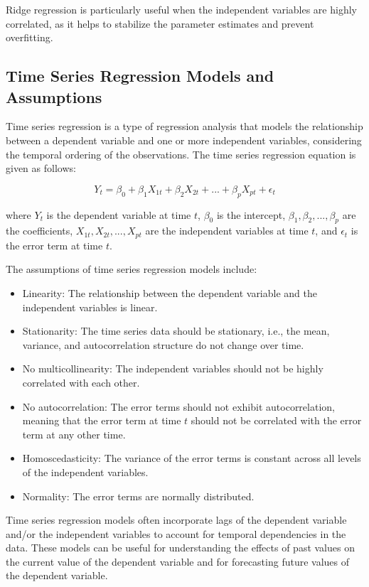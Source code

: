 \documentclass{article}
\begin{document}
Ridge regression is particularly useful when the independent variables are highly correlated, as it helps to stabilize the parameter estimates and prevent overfitting.

\subsection{Time Series Regression Models and Assumptions}
Time series regression is a type of regression analysis that models the relationship between a dependent variable and one or more independent variables, considering the temporal ordering of the observations. The time series regression equation is given as follows:

\begin{equation}
Y_t = \beta_0 + \beta_1X_{1t} + \beta_2X_{2t} + ... + \beta_pX_{pt} + \epsilon_t
\end{equation}

where $Y_t$ is the dependent variable at time $t$, $\beta_0$ is the intercept, $\beta_1, \beta_2, ..., \beta_p$ are the coefficients, $X_{1t}, X_{2t}, ..., X_{pt}$ are the independent variables at time $t$, and $\epsilon_t$ is the error term at time $t$.

The assumptions of time series regression models include:

\begin{itemize}
\item Linearity: The relationship between the dependent variable and the independent variables is linear.
\item Stationarity: The time series data should be stationary, i.e., the mean, variance, and autocorrelation structure do not change over time.
\item No multicollinearity: The independent variables should not be highly correlated with each other.
\item No autocorrelation: The error terms should not exhibit autocorrelation, meaning that the error term at time $t$ should not be correlated with the error term at any other time.
\item Homoscedasticity: The variance of the error terms is constant across all levels of the independent variables.
\item Normality: The error terms are normally distributed.
\end{itemize}

Time series regression models often incorporate lags of the dependent variable and/or the independent variables to account for temporal dependencies in the data. These models can be useful for understanding the effects of past values on the current value of the dependent variable and for forecasting future values of the dependent variable.
\end{document}
